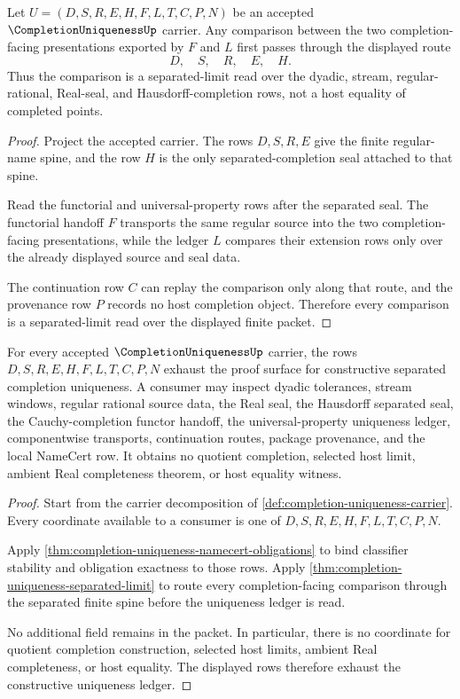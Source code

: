 \begin{theorem}
\label{thm:completion-uniqueness-separated-limit}
Let $U=(D,S,R,E,H,F,L,T,C,P,N)$ be an accepted $\CompletionUniquenessUp$ carrier. Any comparison between the two completion-facing presentations exported by $F$ and $L$ first passes through the displayed route
$$
D,\quad S,\quad R,\quad E,\quad H.
$$
Thus the comparison is a separated-limit read over the dyadic, stream, regular-rational, Real-seal, and Hausdorff-completion rows, not a host equality of completed points.
\end{theorem}
\begin{proof}
Project the accepted carrier. The rows $D,S,R,E$ give the finite regular-name spine, and the row $H$ is the only separated-completion seal attached to that spine.

Read the functorial and universal-property rows after the separated seal. The functorial handoff $F$ transports the same regular source into the two completion-facing presentations, while the ledger $L$ compares their extension rows only over the already displayed source and seal data.

The continuation row $C$ can replay the comparison only along that route, and the provenance row $P$ records no host completion object. Therefore every comparison is a separated-limit read over the displayed finite packet.
\end{proof}

\begin{theorem}
\label{thm:completion-uniqueness-ledger-exhaustion}
For every accepted $\CompletionUniquenessUp$ carrier, the rows $D,S,R,E,H,F,L,T,C,P,N$ exhaust the proof surface for constructive separated completion uniqueness. A consumer may inspect dyadic tolerances, stream windows, regular rational source data, the Real seal, the Hausdorff separated seal, the Cauchy-completion functor handoff, the universal-property uniqueness ledger, componentwise transports, continuation routes, package provenance, and the local NameCert row. It obtains no quotient completion, selected host limit, ambient Real completeness theorem, or host equality witness.
\end{theorem}
\begin{proof}
Start from the carrier decomposition of \autoref{def:completion-uniqueness-carrier}. Every coordinate available to a consumer is one of $D,S,R,E,H,F,L,T,C,P,N$.

Apply \autoref{thm:completion-uniqueness-namecert-obligations} to bind classifier stability and obligation exactness to those rows. Apply \autoref{thm:completion-uniqueness-separated-limit} to route every completion-facing comparison through the separated finite spine before the uniqueness ledger is read.

No additional field remains in the packet. In particular, there is no coordinate for quotient completion construction, selected host limits, ambient Real completeness, or host equality. The displayed rows therefore exhaust the constructive uniqueness ledger.
\end{proof}

